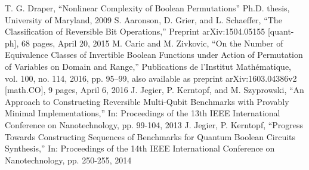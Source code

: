 \documentclass{wfiisul}
\begin{document}
	T. G. Draper, ``Nonlinear Complexity of Boolean Permutations'' Ph.D. thesis, University of Maryland, 2009
	S. Aaronson, D. Grier, and L. Schaeffer, ``The Classification of Reversible Bit Operations,'' Preprint arXiv:1504.05155 [quant-ph], 68 pages, April 20, 2015
	M. Caric and M. Zivkovic, ``On the Number of Equivalence Classes of Invertible Boolean Functions under Action of Permutation of Variables on Domain and Range,'' Publications de l'Institut Mathématique, vol. 100, no. 114, 2016, pp. 95–99, also available as preprint arXiv:1603.04386v2 [math.CO], 9 pages, April 6, 2016
	J. Jegier, P. Kerntopf, and M. Szyprowski, ``An Approach to Constructing Reversible Multi-Qubit Benchmarks with Provably Minimal Implementations,'' In: Proceedings of the 13th IEEE International Conference on Nanotechnology, pp. 99-104, 2013
	J. Jegier, P. Kerntopf, ``Progress Towards Constructing Sequences of Benchmarks for Quantum Boolean Circuits Synthesis,'' In: Proceedings of the 14th IEEE International Conference on Nanotechnology, pp. 250-255, 2014
\end{document}
